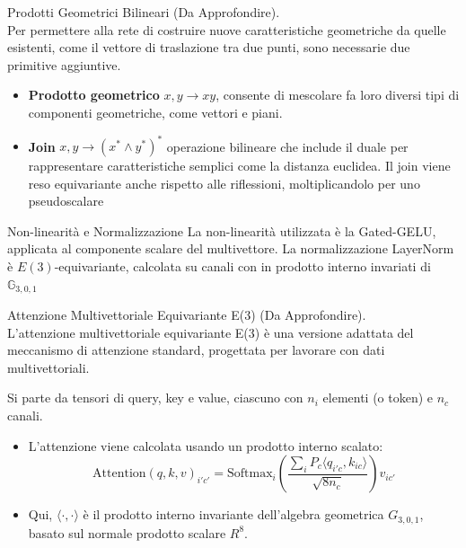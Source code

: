 \begin{frame}{Prodotti Geometrici Bilineari}
    (Da Approfondire).\\
    Per permettere alla rete di costruire nuove caratteristiche geometriche da quelle 
    esistenti, come il vettore di traslazione tra due punti, sono necessarie due 
    primitive aggiuntive. 
    \begin{itemize}
        \item \textbf{Prodotto geometrico} \(x, y \rightarrow xy \), consente di mescolare fa 
        loro diversi tipi di componenti geometriche, come vettori e piani.
        \item \textbf{Join} \( x,y \rightarrow (x^* \wedge y^*)^* \) operazione bilineare 
        che include il duale per rappresentare caratteristiche semplici come la distanza 
        euclidea. Il join viene reso equivariante anche rispetto alle riflessioni, 
        moltiplicandolo per uno pseudoscalare
    \end{itemize}
\end{frame}

\begin{frame}{Non-linearità e Normalizzazione}
    La non-linearità utilizzata è la Gated-GELU, applicata al componente scalare del 
    multivettore. La normalizzazione LayerNorm è \( E(3) \)-equivariante, calcolata su 
    canali con in prodotto interno invariati di \( \mathbb{G}_{3,0,1} \)
\end{frame}

\begin{frame}{Attenzione Multivettoriale Equivariante E(3)} 
    (Da Approfondire).\\
    L'attenzione multivettoriale equivariante E(3) è una versione adattata del meccanismo 
    di attenzione standard, progettata per lavorare con dati multivettoriali.

    Si parte da tensori di query, key e value, ciascuno con \( n_i \) elementi (o token) 
    e \( n_c \) canali.
    \begin{itemize}
        \item L'attenzione viene calcolata usando un prodotto interno scalato:
        \[
            \text{Attention}(q, k, v)_{i' c'} = \text{Softmax}_i 
            \left( \frac{\sum_i P_c \langle q_{i' c}, k_{i c} \rangle}{\sqrt{8 n_c}} \right) v_{i c'}
        \]
        \item Qui, \( \langle \cdot, \cdot \rangle \) è il prodotto interno invariante 
        dell’algebra geometrica \( G_{3,0,1} \), basato sul normale prodotto scalare \( R^8 \).
    \end{itemize}
    
\end{frame}


